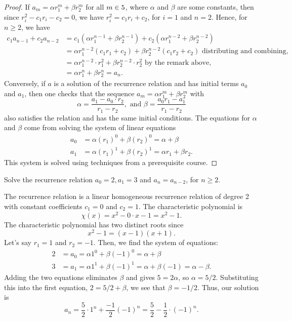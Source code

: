 \begin{proof}
 If $a_m=\alpha r_1^m+\beta r_2^m$ for all $m\in 5$, where $\alpha$ and $\beta$ are some
 constants, then since $r_i^2-c_1r_i-c_2=0$, we have $r_i^2=c_1r_i+c_2$, for $i=1$
 and $n=2$.
 Hence, for $n\geq 2$, we have
 \begin{align*}
  c_1a_{n-1}+c_2a_{n-2}&= c_1(\alpha r_1^{n-1}+\beta r_2^{n-1}) + c_2(\alpha r_1^{n-2}+\beta r_2^{n-2})\\
  &= \alpha r_1^{n-2}(c_1r_1 + c_2) + \beta r_2^{n-2}(c_1r_2+c_2) \text{ distributing and combining,} \\
  &= \alpha r_1^{n-2}\cdot r_1^2 + \beta r_2^{n-2}\cdot r_2^2 \text{ by the remark above,} \\
  &= \alpha r_1^n+\beta r_2^n = a_n.
 \end{align*}
 Conversely, if $a$ is a solution of the recurrence relation and has initial terms $a_0$ and $a_1$, then
 one checks that the sequence $a_m=\alpha r_1^m+\beta r_2^m$ with 
 \begin{equation}\label{eqn:alpha beta}
  \alpha = \frac{a_1-a_0\cdot r_2}{r_1-r_2}, \text{ and } \beta =\frac{a_0r_1-a_1}{r_1-r_2}
 \end{equation}
 also satisfies the relation and has the same initial conditions. The equations for $\alpha$ and $\beta$
 come from solving the system of linear equations
 \begin{align*}
  a_0 & =\alpha (r_1)^0 + \beta (r_2)^0 = \alpha + \beta \\
  a_1 & = \alpha (r_1)^1 + \beta (r_2)^1 = \alpha r_1 + \beta r_2.
 \end{align*}
 This system is solved using techniques from a prerequisite course.
\end{proof} 

\begin{exmp}
 Solve the recurrence relation $a_0=2, a_1=3$ and $a_n=a_{n-2}$, for $n\geq 2$.
\end{exmp}
\begin{soln}
 The recurrence relation is a linear homogeneous recurrence relation of degree 2 with
 constant coefficients $c_1=0$ and $c_2=1$. The characteristic polynomial is 
 $$\chi(x)=x^2-0\cdot x-1=x^2-1.$$
 The characteristic polynomial has two distinct roots since
 \[
  x^2-1=(x-1)(x+1).
 \] 
 Let's say $r_1=1$ and $r_2=-1$.
 Then, we find the system of equations:
 \begin{align*}
  2&=a_0=\alpha 1^0 + \beta (-1)^0 = \alpha + \beta \\
  3 &= a_1=\alpha 1^1 +\beta (-1)^1 = \alpha + \beta (-1) = \alpha -\beta.
 \end{align*}
 Adding the two equations eliminates $\beta$ and gives $5=2\alpha$, so $\alpha=5/2$.
 Substituting this into the first equation, $2=5/2 + \beta$, we see that $\beta = -1/2$.
 Thus, our solution is
 \[
  a_n=\frac{5}{2}\cdot 1^n + \frac{-1}{2} (-1)^n = \frac{5}{2} - \frac{1}{2}\cdot (-1)^n.
 \]
\end{soln} 


